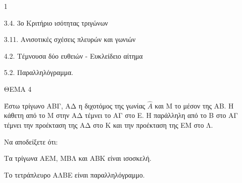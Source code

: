 \begin{ylh}{1}
    \item 3.4. 3ο Κριτήριο ισότητας τριγώνων
    \item 3.11. Ανισοτικές σχέσεις πλευρών και γωνιών
    \item 4.2. Τέμνουσα δύο ευθειών - Ευκλείδειο αίτημα
    \item 5.2. Παραλληλόγραμμα.
\end{ylh}

ΘΕΜΑ 4

Έστω τρίγωνο ΑΒΓ, ΑΔ η διχοτόμος της γωνίας $\widehat{Α}$ και Μ το μέσον της ΑΒ. Η κάθετη από το Μ στην ΑΔ τέμνει το ΑΓ στο Ε. Η παράλληλη από το Β στο ΑΓ τέμνει την προέκταση της ΑΔ στο Κ και την προέκταση της ΕΜ στο Λ.

Να αποδείξετε ότι:

\begin{alist}
\item Τα τρίγωνα ΑΕΜ, ΜΒΛ και ΑΒΚ είναι ισοσκελή. 

\item Το τετράπλευρο ΑΛΒΕ είναι παραλληλόγραμμο. 


\end{alist}
